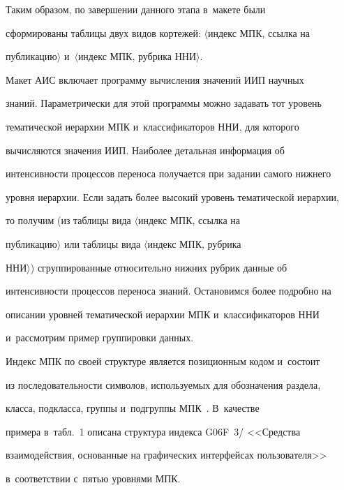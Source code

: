      Таким образом, по завершении данного этапа в~макете были 


сформированы таблицы двух видов кортежей: $\langle$индекс МПК, ссылка на 


публикацию$\rangle$ и~$\langle$индекс МПК, рубрика ННИ$\rangle$.


     


     Макет АИС включает программу вычисления значений ИИП научных 


знаний. Параметрически для этой программы можно задавать тот уровень 


тематической иерархии МПК и~классификаторов ННИ, для которого 


вычисляются значения ИИП. Наиболее детальная информация об 


интенсивности процессов переноса получается при задании самого нижнего 


уровня иерархии. Если задать более высокий уровень тематической иерархии, 


то получим (из таблицы вида $\langle$индекс МПК, ссылка на 


публикацию$\rangle$ или таблицы вида $\langle$индекс МПК, рубрика 


ННИ$\rangle$) сгруппированные относительно нижних рубрик данные об 


интенсивности процессов переноса знаний. Остановимся более подробно на 


описании уровней тематической иерархии МПК и~классификаторов ННИ 


и~рассмотрим пример группировки данных.


     


     Индекс МПК по своей структуре является позиционным кодом и~состоит 


из последовательности символов, используемых для обозначения раздела, 


класса, подкласса, группы и~подгруппы МПК~\cite{21-mm}. В~качестве 


примера в~табл.~1 описана структура индекса G06F~3\!/ <<Средства 


взаимодействия, основанные на графических интерфейсах пользователя>> 


в~соответствии с~пятью уровнями МПК.


     


